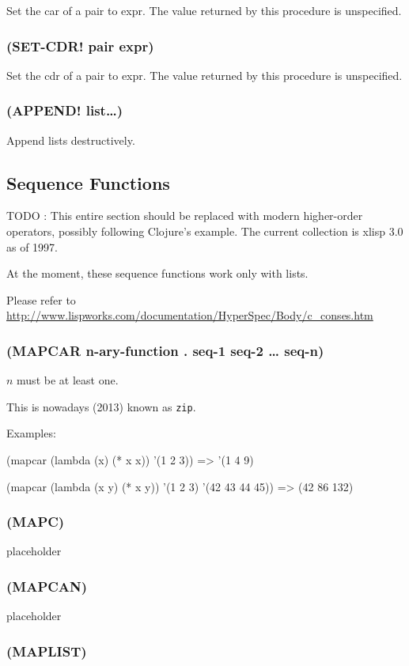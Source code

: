 \documentclass[11pt]{article}
\begin{document}
Set the car of a pair to expr.  The value returned by this procedure
is unspecified.
\subsubsection{(SET-CDR! pair expr)}
\label{sec-4-14-2}

Set the cdr of a pair to expr.  The value returned by this procedure
is unspecified.
\subsubsection{(APPEND!  list\ldots{})}
\label{sec-4-14-3}

Append lists destructively.
\subsection{Sequence Functions}
\label{sec-4-15}

TODO : This entire section should be replaced with modern
higher-order operators, possibly following Clojure's example.
The current collection is xlisp 3.0 as of 1997.

At the moment, these sequence functions work only with lists.

Please refer to
\url{http://www.lispworks.com/documentation/HyperSpec/Body/c_conses.htm}

\subsubsection{(MAPCAR n-ary-function . seq-1 seq-2 \ldots{} seq-n)}
\label{sec-4-15-1}

$n$ must be at least one.

This is nowadays (2013) known as \verb|zip|.

Examples:

(mapcar (lambda (x) (* x x)) '(1 2 3)) => '(1 4 9)

(mapcar (lambda (x y) (* x y)) '(1 2 3) '(42 43 44 45)) =>
(42 86 132)
\subsubsection{(MAPC)}
\label{sec-4-15-2}

placeholder
\subsubsection{(MAPCAN)}
\label{sec-4-15-3}

placeholder
\subsubsection{(MAPLIST)}
\label{sec-4-15-4}
\end{document}
